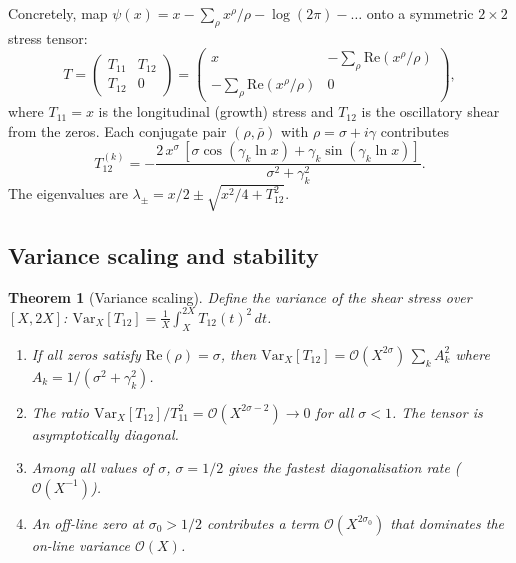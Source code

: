 \documentclass[11pt,a4paper]{article}
\theoremstyle{plain}
\newtheorem{theorem}{Theorem}[section]
\theoremstyle{definition}
\theoremstyle{remark}
\newcommand{\Order}[1]{\mathcal{O}(#1)}
\begin{document}
Concretely, map
$\psi(x) = x - \sum_\rho x^\rho/\rho - \log(2\pi) - \ldots$
onto a symmetric $2 \times 2$ stress tensor:
\begin{equation}\label{eq:stress-tensor}
  T = \begin{pmatrix} T_{11} & T_{12} \\ T_{12} & 0 \end{pmatrix}
    = \begin{pmatrix} x & -\sum_\rho \mathrm{Re}(x^\rho/\rho) \\
                      -\sum_\rho \mathrm{Re}(x^\rho/\rho) & 0 \end{pmatrix},
\end{equation}
where $T_{11} = x$ is the longitudinal (growth) stress and $T_{12}$ is
the oscillatory shear from the zeros.  Each conjugate pair
$(\rho, \bar{\rho})$ with $\rho = \sigma + i\gamma$ contributes
\begin{equation}\label{eq:T12-mode}
  T_{12}^{(k)} = -\frac{2\,x^\sigma\,[\sigma\cos(\gamma_k \ln x) + \gamma_k \sin(\gamma_k \ln x)]}{\sigma^2 + \gamma_k^2}.
\end{equation}
The eigenvalues are
$\lambda_\pm = x/2 \pm \sqrt{x^2/4 + T_{12}^2}$.

\subsection{Variance scaling and stability}

\begin{theorem}[Variance scaling]\label{thm:variance}
Define the variance of the shear stress over $[X, 2X]$:
$\mathrm{Var}_X[T_{12}] = \frac{1}{X}\int_X^{2X} T_{12}(t)^2\,dt$.
\begin{enumerate}[label=(\roman*),noitemsep]
  \item If all zeros satisfy $\mathrm{Re}(\rho) = \sigma$, then
    $\mathrm{Var}_X[T_{12}] = \Order{X^{2\sigma}}\,\sum_k A_k^2$
    where $A_k = 1/(\sigma^2 + \gamma_k^2)$.
  \item The ratio $\mathrm{Var}_X[T_{12}]/T_{11}^2 = \Order{X^{2\sigma - 2}} \to 0$
    for all $\sigma < 1$.  The tensor is asymptotically diagonal.
  \item Among all values of $\sigma$, $\sigma = 1/2$ gives the
    \emph{fastest} diagonalisation rate ($\Order{X^{-1}}$).
  \item An off-line zero at $\sigma_0 > 1/2$ contributes a term
    $\Order{X^{2\sigma_0}}$ that dominates the on-line variance $\Order{X}$.
\end{enumerate}
\end{theorem}
\end{document}
